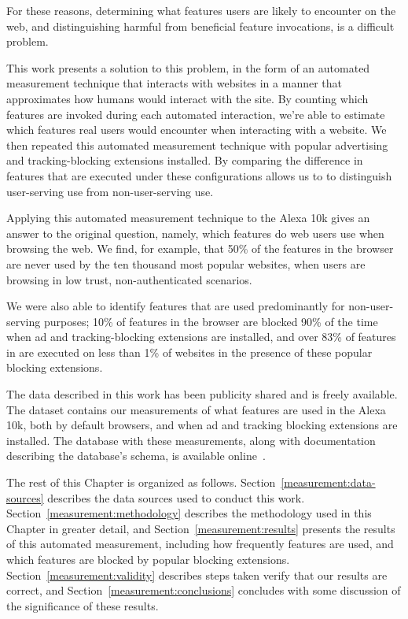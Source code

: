 For these reasons, determining what \WAPI features users are likely
to encounter on the web, and distinguishing harmful from beneficial feature
invocations, is a difficult problem.

This work presents a solution to this problem, in the form of an automated
measurement technique that interacts with websites in a manner that
approximates how humans would interact with the site.  By counting which
features are invoked during each automated interaction, we're able to estimate
which features real users would encounter when interacting with a website. We
then repeated this automated measurement technique with popular advertising and
tracking-blocking extensions installed.  By comparing the difference in
features that are executed under these configurations allows us to to
distinguish user-serving \WAPI use from non-user-serving \WAPI use.

Applying this automated measurement technique to the Alexa 10k gives an
answer to the original question, namely, which \WAPI features do web users use when
browsing the web.  We find, for example, that 50\% of the \WAPI features in the
browser are never used by the ten thousand most popular websites, when users
are browsing in low trust, non-authenticated scenarios.

We were also able to identify features that are used
predominantly for non-user-serving purposes; 10\% of \WAPI features in the
browser are blocked 90\% of the time when ad and tracking-blocking extensions
are installed,  and over 83\% of features in are executed on less than 1\% of
websites in the presence of these popular blocking extensions.

The data described in this work has been publicity shared and is freely
available.  The dataset contains our measurements of what \JS features are used
in the Alexa 10k, both by default browsers, and when ad and tracking blocking
extensions are installed.  The database with these measurements, along with
documentation describing the database's schema, is available
online~\cite{snyderp2016webapidata}.

The rest of this Chapter is organized as follows.
Section~\ref{measurement:data-sources} describes the data sources used to
conduct this work. Section~\ref{measurement:methodology} describes the
methodology used in this Chapter in greater detail, and
Section~\ref{measurement:results} presents the results of this automated
measurement, including how frequently features are used, and which features are
blocked by popular blocking extensions.  Section~\ref{measurement:validity}
describes steps taken verify that our results are correct, and
Section~\ref{measurement:conclusions} concludes with some discussion of the
significance of these results.
